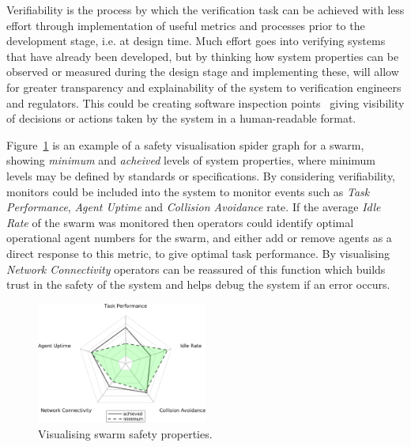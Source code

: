 \documentclass[lettersize,journal]{IEEEtran}
\begin{document}
Verifiability is the process by which the verification task can be achieved with less effort through implementation of useful metrics and processes prior to the  development stage, i.e. at design time. Much effort goes into verifying systems that have already been developed, but by thinking how system properties can be observed or measured during the design stage and implementing these, will allow for greater transparency and explainability of the system to verification engineers and regulators. This could be creating software inspection points~\cite{koopman2018toward} giving visibility of decisions or actions taken by the system in a human-readable format. 

Figure~\ref{swarm_trust_spider} is an example of a safety visualisation spider graph for a swarm, showing \emph{minimum} and \emph{acheived} levels of system properties, where minimum levels may be defined by standards or specifications. By considering verifiability, monitors could be included into the system to monitor events such as \emph{Task Performance}, \emph{Agent Uptime} and \emph{Collision Avoidance} rate. If the average \emph{Idle Rate} of the swarm was monitored then operators could identify optimal operational agent numbers for the swarm, and either add or remove agents as a direct response to this metric, to give optimal task performance. By visualising \emph{Network Connectivity} operators can be reassured of this function which builds trust in the safety of the system and helps debug the system if an error occurs. 

\begin{figure}
	\centering
	\includegraphics[width=0.5\textwidth]{figures/swarm_trust_spider.png}
	\caption{Visualising swarm safety properties.}
	\label{swarm_trust_spider}
\end{figure}

\end{document}
